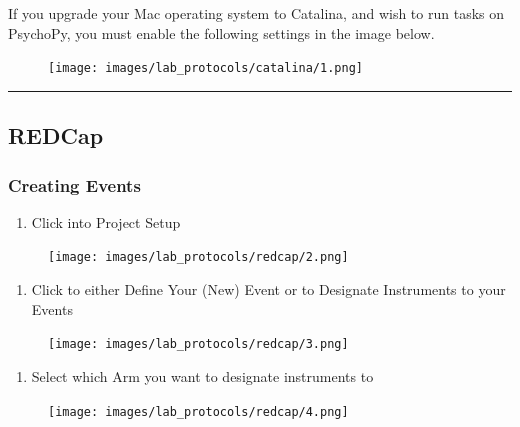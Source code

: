 \documentclass[
]{book}
\providecommand{\tightlist}{%
  \setlength{\itemsep}{0pt}\setlength{\parskip}{0pt}}
\begin{document}
If you upgrade your Mac operating system to Catalina, and wish to run tasks on PsychoPy, you must enable the following settings in the image below.

\begin{figure}
\centering
\texttt{[image: images/lab\_protocols/catalina/1.png]}
\caption{}
\end{figure}

\begin{center}\rule{0.5\linewidth}{0.5pt}\end{center}

\hypertarget{redcap}{%
\subsection{REDCap}\label{redcap}}

\hypertarget{creating-events}{%
\subsubsection{Creating Events}\label{creating-events}}

\begin{enumerate}
\def\labelenumi{\arabic{enumi}.}
\tightlist
\item
  Click into Project Setup
\end{enumerate}

\begin{figure}
\centering
\texttt{[image: images/lab\_protocols/redcap/2.png]}
\caption{}
\end{figure}

\begin{enumerate}
\def\labelenumi{\arabic{enumi}.}
\setcounter{enumi}{1}
\tightlist
\item
  Click to either Define Your (New) Event or to Designate Instruments to your Events
\end{enumerate}

\begin{figure}
\centering
\texttt{[image: images/lab\_protocols/redcap/3.png]}
\caption{}
\end{figure}

\begin{enumerate}
\def\labelenumi{\arabic{enumi}.}
\setcounter{enumi}{2}
\tightlist
\item
  Select which Arm you want to designate instruments to
\end{enumerate}

\begin{figure}
\centering
\texttt{[image: images/lab\_protocols/redcap/4.png]}
\caption{}
\end{figure}
\end{document}
